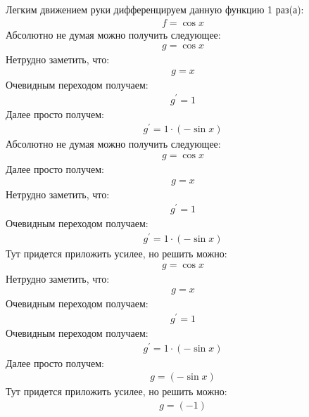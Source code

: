 \documentclass[12pt,a4paper]{scrartcl}
\begin{document}
Легким движением руки дифференцируем данную функцию 1 раз(а):
\begin{gather}\label{eq:55574b10}f  =  \cos{ x } \end{gather}
Абсолютно не думая можно получить следующее:
\begin{gather}\label{eq:55574b10}g  =  \cos{ x } \end{gather}
Нетрудно заметить, что:
\begin{gather}\label{eq:55574ae0}g  = x\end{gather}
Очевидным переходом получаем:
\begin{gather}\label{eq:55574c30}g^\prime  = 1\end{gather}
Далее просто получем:
\begin{gather}\label{eq:55574c00}g^\prime  = 1 \cdot  \left(- \sin{ x } \right) \end{gather}
Абсолютно не думая можно получить следующее:
\begin{gather}\label{eq:55574b10}g  =  \cos{ x } \end{gather}
Далее просто получем:
\begin{gather}\label{eq:55574ae0}g  = x\end{gather}
Нетрудно заметить, что:
\begin{gather}\label{eq:55575140}g^\prime  = 1\end{gather}
Очевидным переходом получаем:
\begin{gather}\label{eq:55575110}g^\prime  = 1 \cdot  \left(- \sin{ x } \right) \end{gather}
Тут придется приложить усилее, но решить можно:
\begin{gather}\label{eq:55574b10}g  =  \cos{ x } \end{gather}
Нетрудно заметить, что:
\begin{gather}\label{eq:55574ae0}g  = x\end{gather}
Очевидным переходом получаем:
\begin{gather}\label{eq:55575260}g^\prime  = 1\end{gather}
Очевидным переходом получаем:
\begin{gather}\label{eq:55575230}g^\prime  = 1 \cdot  \left(- \sin{ x } \right) \end{gather}
Далее просто получем:
\begin{gather}\label{eq:55574ae0}g  =  \left(- \sin{ x } \right) \end{gather}
Тут придется приложить усилее, но решить можно:
\begin{gather}\label{eq:55575260}g  = \left(-1\right)\end{gather}
\end{document}
